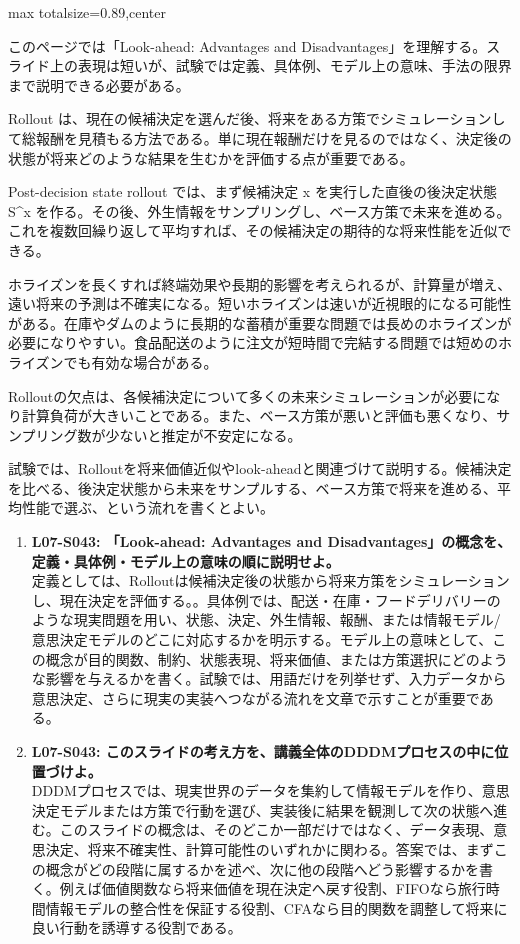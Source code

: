 \begin{minipage}[t]{0.58\textwidth}
\begin{adjustbox}{max totalsize={\textwidth}{0.89\textheight},center}
\begin{minipage}{\textwidth}\scriptsize
{}このページでは「Look-ahead: Advantages and Disadvantages」を理解する。スライド上の表現は短いが、試験では定義、具体例、モデル上の意味、手法の限界まで説明できる必要がある。\par
Rollout は、現在の候補決定を選んだ後、将来をある方策でシミュレーションして総報酬を見積もる方法である。単に現在報酬だけを見るのではなく、決定後の状態が将来どのような結果を生むかを評価する点が重要である。\par
Post-decision state rollout では、まず候補決定 x を実行した直後の後決定状態 S\textasciicircum{}x を作る。その後、外生情報をサンプリングし、ベース方策で未来を進める。これを複数回繰り返して平均すれば、その候補決定の期待的な将来性能を近似できる。\par
ホライズンを長くすれば終端効果や長期的影響を考えられるが、計算量が増え、遠い将来の予測は不確実になる。短いホライズンは速いが近視眼的になる可能性がある。在庫やダムのように長期的な蓄積が重要な問題では長めのホライズンが必要になりやすい。食品配送のように注文が短時間で完結する問題では短めのホライズンでも有効な場合がある。\par
Rolloutの欠点は、各候補決定について多くの未来シミュレーションが必要になり計算負荷が大きいことである。また、ベース方策が悪いと評価も悪くなり、サンプリング数が少ないと推定が不安定になる。\par
試験では、Rolloutを将来価値近似やlook-aheadと関連づけて説明する。候補決定を比べる、後決定状態から未来をサンプルする、ベース方策で将来を進める、平均性能で選ぶ、という流れを書くとよい。\par{}\begin{enumerate}\item \textbf{L07-S043: 「Look-ahead: Advantages and Disadvantages」の概念を、定義・具体例・モデル上の意味の順に説明せよ。}\\定義としては、Rolloutは候補決定後の状態から将来方策をシミュレーションし、現在決定を評価する。。具体例では、配送・在庫・フードデリバリーのような現実問題を用い、状態、決定、外生情報、報酬、または情報モデル/意思決定モデルのどこに対応するかを明示する。モデル上の意味として、この概念が目的関数、制約、状態表現、将来価値、または方策選択にどのような影響を与えるかを書く。試験では、用語だけを列挙せず、入力データから意思決定、さらに現実の実装へつながる流れを文章で示すことが重要である。\item \textbf{L07-S043: このスライドの考え方を、講義全体のDDDMプロセスの中に位置づけよ。}\\DDDMプロセスでは、現実世界のデータを集約して情報モデルを作り、意思決定モデルまたは方策で行動を選び、実装後に結果を観測して次の状態へ進む。このスライドの概念は、そのどこか一部だけではなく、データ表現、意思決定、将来不確実性、計算可能性のいずれかに関わる。答案では、まずこの概念がどの段階に属するかを述べ、次に他の段階へどう影響するかを書く。例えば価値関数なら将来価値を現在決定へ戻す役割、FIFOなら旅行時間情報モデルの整合性を保証する役割、CFAなら目的関数を調整して将来に良い行動を誘導する役割である。\end{enumerate}

\end{minipage}
\end{adjustbox}
\end{minipage}
